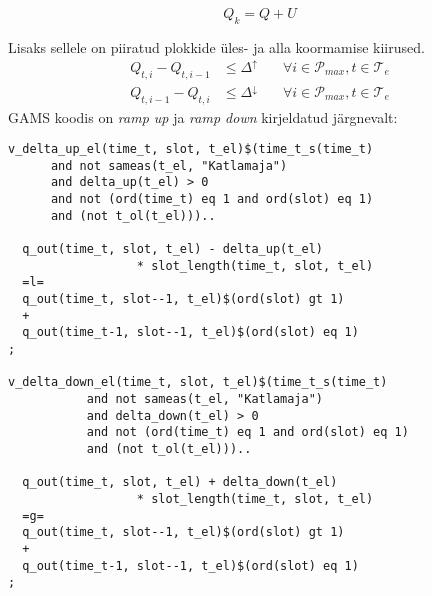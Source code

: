 \documentclass[10pt,a4paper]{article}
\begin{document}
\begin{equation}
Q_k = Q + U
\end{equation}

Lisaks sellele on piiratud plokkide üles- ja alla koormamise kiirused.
\begin{align}
Q_{t,i} - Q_{t,i-1} &\leq \mathit{\Delta^{\uparrow}} \quad &\forall i \in \mathcal{P}_{max}, t \in \mathcal{T}_e\\
Q_{t,i-1} - Q_{t,i} &\leq \mathit{\Delta^{\downarrow}}\quad &\forall i \in \mathcal{P}_{max}, t \in \mathcal{T}_e
\end{align}
GAMS koodis on \emph{ramp up} ja \emph{ramp down} kirjeldatud järgnevalt:
\begin{verbatim}
v_delta_up_el(time_t, slot, t_el)$(time_t_s(time_t)
      and not sameas(t_el, "Katlamaja")
      and delta_up(t_el) > 0
      and not (ord(time_t) eq 1 and ord(slot) eq 1) 
      and (not t_ol(t_el)))..

  q_out(time_t, slot, t_el) - delta_up(t_el)
                  * slot_length(time_t, slot, t_el)
  =l=
  q_out(time_t, slot--1, t_el)$(ord(slot) gt 1)
  +
  q_out(time_t-1, slot--1, t_el)$(ord(slot) eq 1)
;

v_delta_down_el(time_t, slot, t_el)$(time_t_s(time_t)
           and not sameas(t_el, "Katlamaja")
           and delta_down(t_el) > 0
           and not (ord(time_t) eq 1 and ord(slot) eq 1) 
           and (not t_ol(t_el)))..

  q_out(time_t, slot, t_el) + delta_down(t_el)
                  * slot_length(time_t, slot, t_el)
  =g=
  q_out(time_t, slot--1, t_el)$(ord(slot) gt 1)
  +
  q_out(time_t-1, slot--1, t_el)$(ord(slot) eq 1)
;
\end{verbatim}
\end{document}
